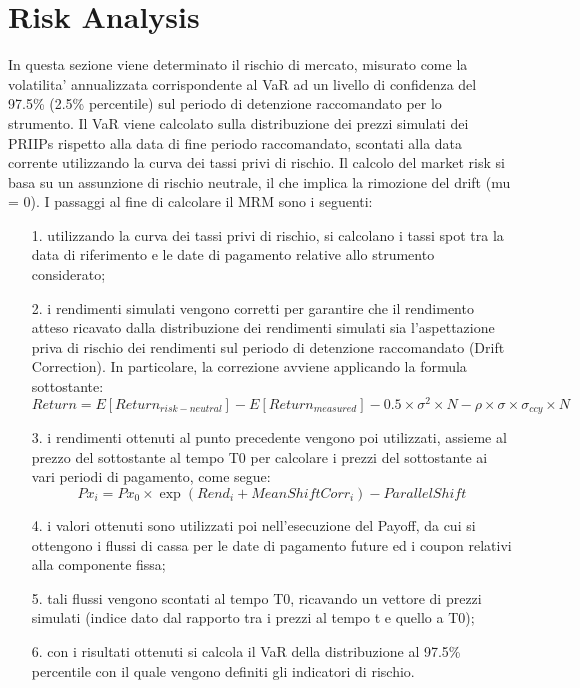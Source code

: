 \documentclass[11pt,fleqn]{extarticle}
\begin{document}
\section{Risk Analysis}
In questa sezione viene determinato il rischio di mercato, misurato come la volatilita' annualizzata corrispondente al VaR ad un livello di confidenza del 97.5\% (2.5\% percentile) sul periodo di detenzione raccomandato per lo strumento. Il VaR viene calcolato sulla distribuzione dei prezzi simulati dei PRIIPs rispetto alla data di fine periodo raccomandato, scontati alla data corrente utilizzando la curva dei tassi privi di rischio.\newline
Il calcolo del market risk si basa su un assunzione di rischio neutrale, il che implica la rimozione del drift (mu = 0). I passaggi al fine di calcolare il MRM sono i seguenti:
\begin{itemize}
\setlength\itemsep{-0.1em}
\item[1.] utilizzando la curva dei tassi privi di rischio, si calcolano i tassi spot tra la data di riferimento e le date di pagamento relative allo strumento considerato;
\item[2.] i rendimenti simulati vengono corretti per garantire che il rendimento atteso ricavato dalla distribuzione dei rendimenti simulati sia l'aspettazione priva di rischio dei rendimenti sul periodo di detenzione raccomandato (Drift Correction). In particolare, la correzione avviene applicando la formula sottostante:
\begin{equation}
Return = E[Return_{risk-neutral}] - E[Return_{measured}] - 0.5\times \sigma^2 \times N - \rho \times \sigma \times \sigma_{ccy} \times N
\end{equation}
\item[3.] i rendimenti ottenuti al punto precedente vengono poi utilizzati, assieme al prezzo del sottostante al tempo T0 per calcolare i prezzi del sottostante ai vari periodi di pagamento, come segue:
\begin{equation}
Px_i = Px_0 \times \exp(Rend_i + MeanShiftCorr_i) - ParallelShift
\end{equation}
\item[4.] i valori ottenuti sono utilizzati poi nell'esecuzione del Payoff, da cui si ottengono i flussi di cassa per le date di pagamento future ed i coupon relativi alla componente fissa;
\item[5.] tali flussi vengono scontati al tempo T0, ricavando un vettore di prezzi simulati (indice dato dal rapporto tra i prezzi al tempo t e quello a T0);
\item[6.] con i risultati ottenuti si calcola il VaR della distribuzione al 97.5\% percentile con il quale vengono definiti gli indicatori di rischio.
\end{itemize}
\end{document}
